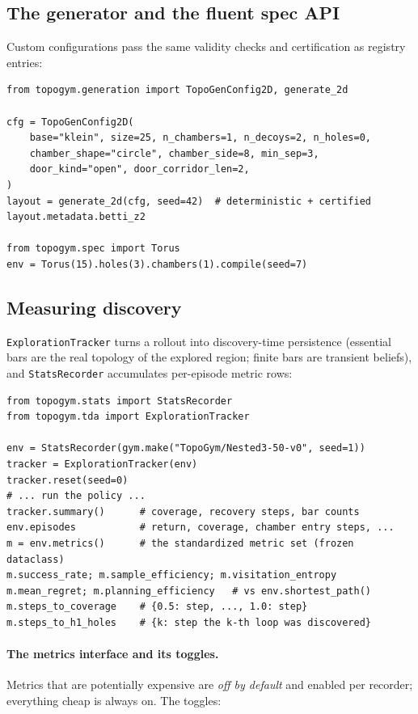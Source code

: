 \documentclass[11pt]{article}
\begin{document}
\subsection{The generator and the fluent spec API}

Custom configurations pass the same validity checks and certification
as registry entries:

\begin{lstlisting}
from topogym.generation import TopoGenConfig2D, generate_2d

cfg = TopoGenConfig2D(
    base="klein", size=25, n_chambers=1, n_decoys=2, n_holes=0,
    chamber_shape="circle", chamber_side=8, min_sep=3,
    door_kind="open", door_corridor_len=2,
)
layout = generate_2d(cfg, seed=42)  # deterministic + certified
layout.metadata.betti_z2

from topogym.spec import Torus
env = Torus(15).holes(3).chambers(1).compile(seed=7)
\end{lstlisting}

\subsection{Measuring discovery}

\texttt{ExplorationTracker} turns a rollout into discovery-time
persistence (essential bars are the real topology of the explored
region; finite bars are transient beliefs), and \texttt{StatsRecorder}
accumulates per-episode metric rows:

\begin{lstlisting}
from topogym.stats import StatsRecorder
from topogym.tda import ExplorationTracker

env = StatsRecorder(gym.make("TopoGym/Nested3-50-v0", seed=1))
tracker = ExplorationTracker(env)
tracker.reset(seed=0)
# ... run the policy ...
tracker.summary()      # coverage, recovery steps, bar counts
env.episodes           # return, coverage, chamber entry steps, ...
m = env.metrics()      # the standardized metric set (frozen dataclass)
m.success_rate; m.sample_efficiency; m.visitation_entropy
m.mean_regret; m.planning_efficiency   # vs env.shortest_path()
m.steps_to_coverage    # {0.5: step, ..., 1.0: step}
m.steps_to_h1_holes    # {k: step the k-th loop was discovered}
\end{lstlisting}

\paragraph{The metrics interface and its toggles.} Metrics that are
potentially expensive are \emph{off by default} and enabled per
recorder; everything cheap is always on. The toggles:
\end{document}
